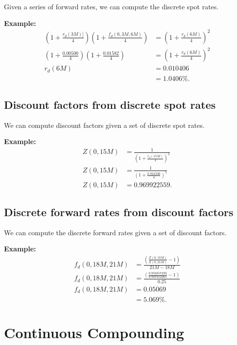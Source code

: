 Given a series of forward rates, we can compute the discrete spot rates.

\textbf{Example:}
\begin{align}
    \left( 1 + \frac{r_d(3M)]}{4}\right) \left( 1 + \frac{f_d(0,3M,6M)}{4} \right) &= \left( 1 + \frac{r_d(6M)}{4} \right)^2 \\[6pt]
    \left( 1 + \frac{0.00500}{4}\right) \left( 1 + \frac{0.01582}{4} \right) &= \left( 1 + \frac{r_d(6M)}{4} \right)^2 \\[6pt]
    r_d(6M) &= 0.010406 \\
    &= 1.0406\%.
\end{align}

\subsection{Discount factors from discrete spot rates}

We can compute discount factors given a set of discrete spot rates.

\textbf{Example:}
\begin{align}
    Z(0,15M) &= \frac{1}{\left( 1 + \frac{r_d(15M)}{4} \right)^5}  \\[6pt]
    Z(0,15M) &= \frac{1}{\left( 1 + \frac{0.024506}{4} \right)^5} \\[6pt]
    Z(0,15M) &= 0.969922559.
\end{align}

\subsection{Discrete forward rates from discount factors}

We can compute the discrete forward rates given a set of discount factors.

\textbf{Example:}
\begin{align}
    f_d(0,18M,21M) &= \frac{\left( \frac{Z(0,18M)}{Z(0,21M)} - 1 \right)}{21M - 18M} \\[6pt]
    f_d(0,18M,21M) &= \frac{\left( \frac{0.959357293}{0.947352265} - 1 \right)}{0.25} \\[6pt]
    f_d(0,18M,21M) &= 0.05069 \\
    &= 5.069\%.
\end{align}

\newpage

\section{Continuous Compounding}
\label{append_A2}

